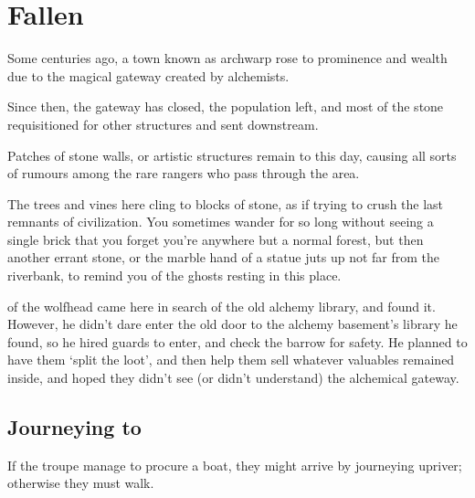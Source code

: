 \section{ Fallen}
\label{lostcity}

\begin{multicols}{2}


\begin{exampletext}
  Some centuries ago, a town known as \gls{archwarp} rose to prominence and wealth due to the magical gateway created by alchemists.

  Since then, the gateway has closed, the population left, and most of the stone requisitioned for other structures and sent downstream.

  Patches of stone walls, or artistic structures remain to this day, causing all sorts of rumours among the rare rangers who pass through the area.
\end{exampletext}

\begin{boxtext}
  The trees and vines here cling to blocks of stone, as if trying to crush the last remnants of civilization.
  You sometimes wander for so long without seeing a single brick that you forget you're anywhere but a normal forest, but then another errant stone, or the marble hand of a statue juts up not far from the riverbank, to remind you of the ghosts resting in this place.
\end{boxtext}

\begin{exampletext}
  \noindent
   of the \gls{wolfhead} came here in search of the old alchemy library, and found it.
  However, he didn't dare enter the old door to the alchemy basement's library he found, so he hired \glspl{guard} to enter, and check the barrow for safety.
  He planned to have them `split the loot', and then help them sell whatever valuables remained inside, and hoped they didn't see (or didn't understand) the alchemical gateway.
\end{exampletext}

\subsection{Journeying to }
If the troupe manage to procure a boat, they might arrive by journeying upriver; otherwise they must walk.


\end{multicols}
